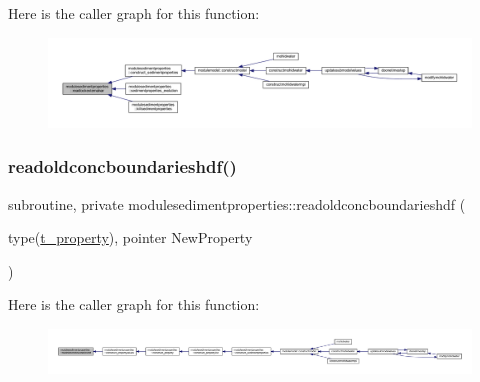 Here is the caller graph for this function\+:\nopagebreak
\begin{figure}[H]
\begin{center}
\leavevmode
\includegraphics[width=350pt]{namespacemodulesedimentproperties_a395db65fca9389b9904d43f9fc450c03_icgraph}
\end{center}
\end{figure}
\mbox{\label{namespacemodulesedimentproperties_a5eab479d8cef7089906fb647d918b3fe}} 
\subsubsection{\texorpdfstring{readoldconcboundarieshdf()}{readoldconcboundarieshdf()}}
{\footnotesize\ttfamily subroutine, private modulesedimentproperties\+::readoldconcboundarieshdf (\begin{DoxyParamCaption}\item[{type(\mbox{\hyperlink{structmodulesedimentproperties_1_1t__property}{t\+\_\+property}}), pointer}]{New\+Property }\end{DoxyParamCaption})\hspace{0.3cm}{\ttfamily [private]}}

Here is the caller graph for this function\+:\nopagebreak
\begin{figure}[H]
\begin{center}
\leavevmode
\includegraphics[width=350pt]{namespacemodulesedimentproperties_a5eab479d8cef7089906fb647d918b3fe_icgraph}
\end{center}
\end{figure}
\mbox{\label{namespacemodulesedimentproperties_a75f3289f9063b5325117a4d39bebace2}} 
